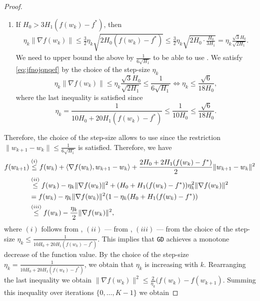 \documentclass[a4paper,11pt]{article}
\newcommand{\algname}[1]{\texttt{#1}}
\newcommand{\1}{\mathbbm{1}}
\theoremstyle{plain}
\begin{document}
\begin{proof}
\begin{enumerate}
        \item If $H_0 > 3H_1(f(w_k) -f^*)$, then
        \begin{align}\label{eq:jfnojqnqef}
        \eta_k\|\nabla f(w_k)\| \le \frac{3}{2}\eta_k\sqrt{2H_0(f(w_k)-f^*)} \le \frac{3}{2}\eta_k \sqrt{2H_0\cdot \frac{H_0}{3H_1}} = \eta_k \frac{\sqrt{3}H_0}{\sqrt{2H_1}}.
        \end{align}
        We need to upper bound the above by $\frac{1}{6\sqrt{H_1}}$ to be able to use . We satisfy \eqref{eq:jfnojqnqef} by the choice of the step-size $\eta_k$
        \[
        \eta_k\|\nabla f(w_k)\| \le \eta_k\frac{\sqrt{3}H_0}{\sqrt{2H_1}} \le \frac{1}{6\sqrt{H_1}} \Leftrightarrow \eta_k \le \frac{\sqrt{6}}{18H_0},
        \]
        where the last inequality is satisfied since 
        \[
        \eta_k = \frac{1}{10H_0 + 20H_1(f(w_k)-f^*)} \le \frac{1}{10H_0} \le \frac{\sqrt{6}}{18H_0}.
        \]
    \end{enumerate}
    Therefore, the choice of the step-size allows to use  since the restriction $\|w_{k+1}-w_k\|\le \frac{1}{6\sqrt{H_1}}$ is satisfied. Therefore, we have
    \begin{align}
        f(w_{k+1}) &\overset{(i)}{\le} f(w_k) + \langle\nabla f(w_k), w_{k+1}-w_k \rangle + \frac{2H_0+2H_1(f(w_k)-f^*)}{2}\|w_{k+1}-w_k\|^2\notag\\
        &\overset{(ii)}{\le} f(w_k) -\eta_k\|\nabla f(w_k)\|^2 + (H_0 + H_1(f(w_k)-f^*))\eta_k^2\|\nabla f(w_k)\|^2\notag\\
        &= f(w_k) - \eta_k\|\nabla f(w_k)\|^2(1-\eta_k(H_0 + H_1(f(w_k) -f^*))\notag\\
        &\overset{(iii)}{\le} f(w_k) - \frac{\eta_k}{2}\|\nabla f(w_k)\|^2,\label{eq:pqmdnoqnwdq}
    \end{align}
    where $(i)$ follows from , $(ii)$ --- from , $(iii)$ --- from the choice of the step-size $\eta_k \le\frac{1}{10H_0 + 20H_1(f(w_k)-f^*)}$. This implies that \algname{GD} achieves a monotone decrease of the function value. By the choice of the step-size $\eta_k = \frac{1}{10H_0 + 20H_1(f(w_k)-f^*)}$, we obtain that $\eta_k$ is increasing with $k.$ Rearranging the last inequality we obtain $\|\nabla f(w_k)\|^2 \le \frac{2}{\eta_k}(f(w_k) - f(w_{k+1}).$ Summing this inequality over iterations $\{0,\hdots, K-1\}$ we obtain


\end{proof}
\end{document}
